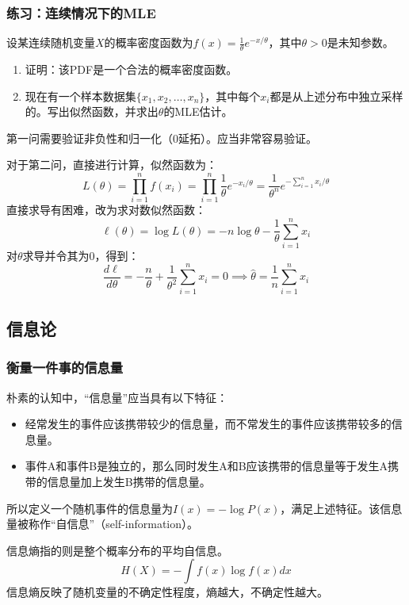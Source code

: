 \documentclass[aspectratio=1610]{ctexbeamer}
\begin{document}
\begin{frame}
    \frametitle{练习：连续情况下的MLE}

    设某连续随机变量$X$的概率密度函数为$f(x) = \frac{1}{\theta} e^{-x/\theta}$，其中$\theta > 0$是未知参数。
    
    \begin{enumerate}
        \item 证明：该PDF是一个合法的概率密度函数。
        \item 现在有一个样本数据集$\{x_1, x_2, \ldots, x_n\}$，其中每个$x_i$都是从上述分布中独立采样的。写出似然函数，并求出$\theta$的MLE估计。
    \end{enumerate}

    \vspace{1em}
    \pause

    第一问需要验证非负性和归一化（0延拓）。应当非常容易验证。

    对于第二问，直接进行计算，似然函数为：
\begin{equation}
L(\theta) = \prod_{i=1}^n f(x_i) = \prod_{i=1}^n \frac{1}{\theta} e^{-x_i/\theta} = \frac{1}{\theta^n} e^{-\sum_{i=1}^n x_i / \theta}
\end{equation}
    直接求导有困难，改为求对数似然函数：
\begin{equation}
\ell(\theta) = \log L(\theta) = -n \log \theta - \frac{1}{\theta} \sum_{i=1}^n x_i
\end{equation}
    对$\theta$求导并令其为0，得到：
\begin{equation}\frac{d\ell}{d\theta} = -\frac{n}{\theta} + \frac{1}{\theta^2} \sum_{i=1}^n x_i = 0 \implies \hat{\theta} = \frac{1}{n} \sum_{i=1}^n x_i
\end{equation}

\end{frame}

\subsection{信息论}

\begin{frame}
    \frametitle{衡量一件事的信息量}

    朴素的认知中，“信息量”应当具有以下特征：
    \begin{itemize}
        \item 经常发生的事件应该携带较少的信息量，而不常发生的事件应该携带较多的信息量。
        \item 事件A和事件B是独立的，那么同时发生A和B应该携带的信息量等于发生A携带的信息量加上发生B携带的信息量。
    \end{itemize}

    所以定义一个随机事件的信息量为$I(x) = -\log P(x)$，满足上述特征。该信息量被称作“自信息”（self-information）。

    信息熵指的则是整个概率分布的平均自信息。\[H(X) = -\int f(x) \log f(x) dx\]
    信息熵反映了随机变量的不确定性程度，熵越大，不确定性越大。
    
\end{frame}
\end{document}
